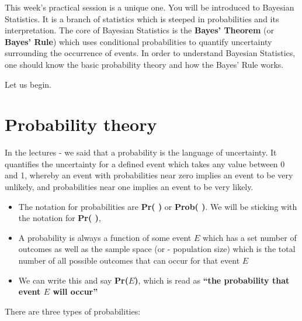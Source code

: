 \documentclass[
]{book}
\begin{document}
This week's practical session is a unique one. You will be introduced to Bayesian Statistics. It is a branch of statistics which is steeped in probabilities and its interpretation. The core of Bayesian Statistics is the \textbf{Bayes' Theorem} (or \textbf{Bayes' Rule}) which uses conditional probabilities to quantify uncertainty surrounding the occurrence of events. In order to understand Bayesian Statistics, one should know the basic probability theory and how the Bayes' Rule works.

Let us begin.

\hypertarget{probability-theory}{%
\section{Probability theory}\label{probability-theory}}

In the lectures - we said that a probability is the language of uncertainty. It quantifies the uncertainty for a defined event which takes any value between 0 and 1, whereby an event with probabilities near zero implies an event to be very unlikely, and probabilities near one implies an event to be very likely.

\begin{itemize}
\item
  The notation for probabilities are \textbf{Pr( )} or \textbf{Prob( )}. We will be sticking with the notation for \textbf{Pr( )},
\item
  A probability is always a function of some event \textbf{\(E\)} which has a set number of outcomes as well as the sample space (or - population size) which is the total number of all possible outcomes that can occur for that event \textbf{\(E\)}
\item
  We can write this and say \textbf{Pr(\(E\))}, which is read as \textbf{``the probability that event \(E\) will occur''}
\end{itemize}

There are three types of probabilities:
\end{document}
